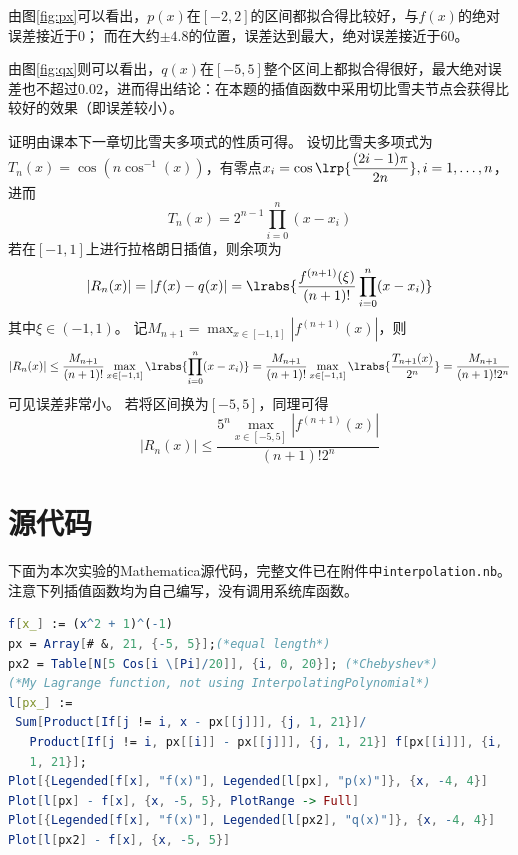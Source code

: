 \documentclass[reportComp]{thesis}
\begin{document}
由图\ref{fig:px}可以看出，$p(x)$在$[-2,2]$的区间都拟合得比较好，与$f(x)$的绝对误差接近于$0$；
而在大约$\pm 4.8$的位置，误差达到最大，绝对误差接近于$60$。

由图\ref{fig:qx}则可以看出，$q(x)$在$[-5,5]$整个区间上都拟合得很好，最大绝对误差也不超过$0.02$，进而得出结论：在本题的插值函数中采用切比雪夫节点会获得比较好的效果（即误差较小）。

证明由课本下一章切比雪夫多项式的性质可得。
设切比雪夫多项式为$T_n(x)=\cos(n\cos^{-1}(x))$，有零点$x_i=\cos\lrp{\dfrac{(2i-1)\pi}{2n}},i=1,\ldots,n$，进而
\[T_n(x)=2^{n-1}\prod_{i=0}^n(x-x_i)\]
若在$[-1,1]$上进行拉格朗日插值，则余项为
\[|R_n(x)|=|f(x)-q(x)|=\lrabs{\frac{f^{(n+1)}(\xi)}{(n+1)!}\prod_{i=0}^{n}(x-x_i)}\]
其中$\xi\in(-1,1)$。
记$M_{n+1}=\max_{x\in[-1,1]}|f^{(n+1)}(x)|$，则
\[|R_n(x)|\leq\frac{M_{n+1}}{(n+1)!}\max_{x\in[-1,1]}\lrabs{\prod_{i=0}^{n}(x-x_i)}=\frac{M_{n+1}}{(n+1)!}\max_{x\in[-1,1]}\lrabs{\frac{T_{n+1}(x)}{2^n}}=\frac{M_{n+1}}{(n+1)!2^n}\]
可见误差非常小。
若将区间换为$[-5,5]$，同理可得
\[|R_{n}(x)|\leq \frac{5^n\max_{x\in[-5,5]}|f^{(n+1)}(x)|}{(n+1)!2^n}\]

\section{源代码}
下面为本次实验的Mathematica源代码，完整文件已在附件中\verb'interpolation.nb'。
注意下列插值函数均为自己编写，没有调用系统库函数。
\begin{lstlisting}[language=mathematica]
f[x_] := (x^2 + 1)^(-1)
px = Array[# &, 21, {-5, 5}];(*equal length*)
px2 = Table[N[5 Cos[i \[Pi]/20]], {i, 0, 20}]; (*Chebyshev*)
(*My Lagrange function, not using InterpolatingPolynomial*)
l[px_] := 
 Sum[Product[If[j != i, x - px[[j]]], {j, 1, 21}]/
   Product[If[j != i, px[[i]] - px[[j]]], {j, 1, 21}] f[px[[i]]], {i, 
   1, 21}];
Plot[{Legended[f[x], "f(x)"], Legended[l[px], "p(x)"]}, {x, -4, 4}]
Plot[l[px] - f[x], {x, -5, 5}, PlotRange -> Full]
Plot[{Legended[f[x], "f(x)"], Legended[l[px2], "q(x)"]}, {x, -4, 4}]
Plot[l[px2] - f[x], {x, -5, 5}]
\end{lstlisting}
\end{document}
